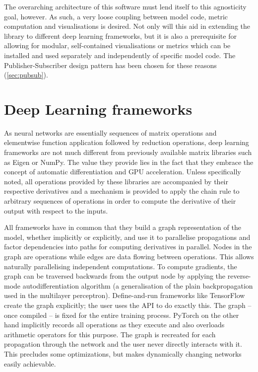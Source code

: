 The overarching architecture of this software must lend itself to this
agnosticity goal, however. As such, a very loose coupling between model code,
metric computation and visualisations is desired. Not only will this aid in
extending the library to different deep learning frameworks, but it is also a
prerequisite for allowing for modular, self-contained visualisations or metrics
which can be installed and used separately and independently of specific model
code. The Publisher-Subscriber design pattern has been chosen for these reasons
(\cref{sec:pubsub}).

\hypertarget{sec:dl-frameworks}{%
\section{Deep Learning frameworks}\label{sec:dl-frameworks}}

As neural networks are essentially sequences of matrix operations and
elementwise function application followed by reduction operations, deep learning
frameworks are not much different from previously available matrix libraries
such as Eigen or NumPy. The value they provide lies in the fact that they
embrace the concept of automatic differentiation and GPU acceleration. Unless
specifically noted, all operations provided by these libraries are accompanied
by their respective derivatives and a mechanism is provided to apply the chain
rule to arbitrary sequences of operations in order to compute the derivative of
their output with respect to the inputs.

All frameworks have in common that they build a graph representation of the
model, whether implicitly or explicitly, and use it to parallelise propagations
and factor dependencies into paths for computing derivatives in parallel. Nodes
in the graph are operations while edges are data flowing between operations.
This allows naturally parallelising independent computations. To compute
gradients, the graph can be traversed backwards from the output node by applying
the reverse-mode autodifferentiation algorithm (a generalisation of the plain
backpropagation used in the multilayer perceptron).  Define-and-run frameworks
like TensorFlow create the graph explicitly; the user uses the API to do exactly
this. The graph -- once compiled -- is fixed for the entire training process.
PyTorch on the other hand implicitly records all operations as they execute and
also overloads arithmetic operators for this purpose. The graph is recreated for each
propagation through the network and the user never directly interacts with it.
This precludes some optimizations, but makes dynamically changing networks
easily achievable.

